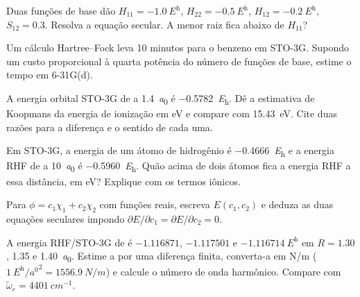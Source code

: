 \begin{exercise}[$\star\star$]\label{exo:b3:computational-chemistry:6}
Duas funções de base dão $H_{11} = \qty{-1.0}{\hartree}$, $H_{22} =
\qty{-0.5}{\hartree}$, $H_{12} = \qty{-0.2}{\hartree}$, $S_{12} = 0.3$. Resolva a
equação secular. A menor raiz fica abaixo de $H_{11}$?
\end{exercise}

\begin{exercise}[$\star\star$]\label{exo:b3:computational-chemistry:7}
Um cálculo Hartree--Fock leva 10 minutos para o benzeno em STO-3G. Supondo
um custo proporcional à quarta potência do número de funções de base,
estime o tempo em 6-31G(d).
\end{exercise}

\begin{exercise}[$\star\star$]\label{exo:b3:computational-chemistry:8}
A energia orbital STO-3G de  a \qty{1.4}{\bohr} é
\qty{-0.5782}{\hartree}. Dê a estimativa de Koopmans da energia de ionização em eV
e compare com \qty{15.43}{eV}. Cite duas razões para a diferença e o sentido
de cada uma.
\end{exercise}

\begin{exercise}[$\star\star$]\label{exo:b3:computational-chemistry:9}
Em STO-3G, a energia de um átomo de hidrogênio é \qty{-0.4666}{\hartree} e a energia
RHF de  a \qty{10}{\bohr} é \qty{-0.5960}{\hartree}. Quão acima de dois
átomos fica a energia RHF a essa distância, em eV? Explique com os termos
iônicos.
\end{exercise}

\begin{exercise}[$\star\star\star$]\label{exo:b3:computational-chemistry:10}
Para $\phi = c_1\chi_1 + c_2\chi_2$ com funções reais, escreva $E(c_1,c_2)$ e
deduza as duas equações seculares impondo $\partial E/\partial c_1 =
\partial E/\partial c_2 = 0$.
\end{exercise}

\begin{exercise}[$\star\star\star$]\label{exo:b3:computational-chemistry:11}
A energia RHF/STO-3G de  é $-1.116871$, $-1.117501$ e
$\qty{-1.116714}{\hartree}$ em $R = 1.30$, 1.35 e \qty{1.40}{\bohr}. Estime
a  por uma diferença finita, converta-a em \unit{N/m}
($\qty{1}{\hartree\per\bohr\squared} = \qty{1556.9}{N/m}$) e calcule o
número de onda harmônico. Compare com $\tilde\omega_e = \qty{4401}{cm^{-1}}$.
\end{exercise}


